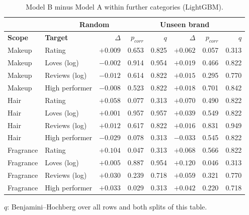 \begin{table}[htbp]
\centering
\small
\begin{tabular}{|l|l|r|r|r|r|r|r|}
\hline
\rowcolor{headfill} \multicolumn{2}{|c|}{} & \multicolumn{3}{c|}{\textbf{Random}} & \multicolumn{3}{c|}{\textbf{Unseen brand}} \\
\hline
\rowcolor{headfill} \textbf{Scope} & \textbf{Target} & \textbf{$\Delta$} & \textbf{$p_{corr}$} & \textbf{$q$} & \textbf{$\Delta$} & \textbf{$p_{corr}$} & \textbf{$q$} \\
\hline
Makeup & Rating & $+0.009$ & 0.653 & 0.825 & $+0.062$ & 0.057 & 0.313 \\
\hline
Makeup & Loves (log) & $-0.002$ & 0.914 & 0.954 & $+0.019$ & 0.466 & 0.822 \\
\hline
Makeup & Reviews (log) & $-0.012$ & 0.614 & 0.822 & $+0.015$ & 0.295 & 0.770 \\
\hline
Makeup & High performer & $-0.008$ & 0.523 & 0.822 & $+0.018$ & 0.701 & 0.842 \\
\hline
\hline
Hair & Rating & $+0.058$ & 0.077 & 0.313 & $+0.070$ & 0.490 & 0.822 \\
\hline
Hair & Loves (log) & $+0.001$ & 0.957 & 0.957 & $+0.039$ & 0.549 & 0.822 \\
\hline
Hair & Reviews (log) & $+0.012$ & 0.617 & 0.822 & $+0.016$ & 0.831 & 0.949 \\
\hline
Hair & High performer & $-0.029$ & 0.078 & 0.313 & $-0.033$ & 0.545 & 0.822 \\
\hline
\hline
Fragrance & Rating & $+0.104$ & 0.047 & 0.313 & $+0.068$ & 0.566 & 0.822 \\
\hline
Fragrance & Loves (log) & $+0.005$ & 0.887 & 0.954 & $+0.120$ & 0.046 & 0.313 \\
\hline
Fragrance & Reviews (log) & $+0.030$ & 0.239 & 0.718 & $+0.059$ & 0.321 & 0.770 \\
\hline
Fragrance & High performer & $+0.033$ & 0.029 & 0.313 & $+0.042$ & 0.220 & 0.718 \\
\hline
\end{tabular}
\par\smallskip
\parbox{0.95\linewidth}{\footnotesize $q$: Benjamini--Hochberg over all rows and both splits of this table.}
\caption{Model B minus Model A within further categories (LightGBM).}
\label{tab:categories}
\end{table}
